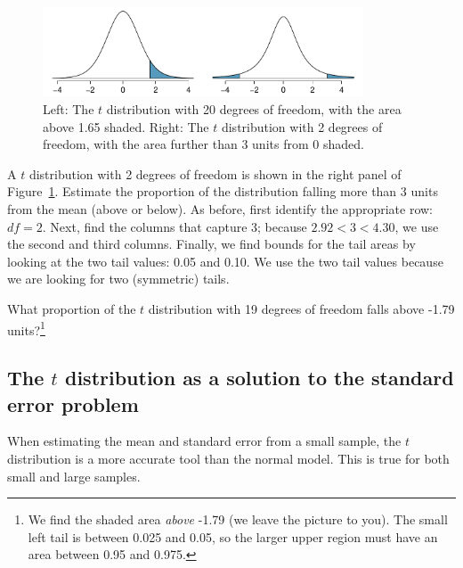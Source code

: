 \begin{figure}
\centering
\includegraphics[width=0.85\textwidth]{05/figures/tDistDF20RightTail1Point65/tDistDF20RightTail1Point65}
\caption{Left: The $t$ distribution with 20 degrees of freedom, with the area above 1.65 shaded. Right: The $t$ distribution with 2 degrees of freedom, with the area further than 3 units from 0 shaded.}
\label{tDistDF20RightTail1Point65}
\end{figure}

\begin{example}{A $t$ distribution with 2 degrees of freedom is shown in the right panel of Figure~\ref{tDistDF20RightTail1Point65}. Estimate the proportion of the distribution falling more than 3 units from the mean (above or below).}
As before, first identify the appropriate row: $df=2$. Next, find the columns that capture 3; because $2.92 < 3 < 4.30$, we use the second and third columns. Finally, we find bounds for the tail areas by looking at the two tail values: 0.05 and 0.10. We use the two tail values because we are looking for two (symmetric) tails.
\end{example}

\begin{exercise}
What proportion of the $t$ distribution with 19 degrees of freedom falls above -1.79 units?\footnote{We find the shaded area \emph{above} -1.79 (we leave the picture to you). The small left tail is between 0.025 and 0.05, so the larger upper region must have an area between 0.95 and 0.975.}


\end{exercise}



\subsection{The $t$ distribution as a solution to the standard error problem}
\label{tDistSolutionToSEProblem}

When estimating the mean and standard error from a small sample, the $t$ distribution is a more accurate tool than the normal model. This is true for both small and large samples.

